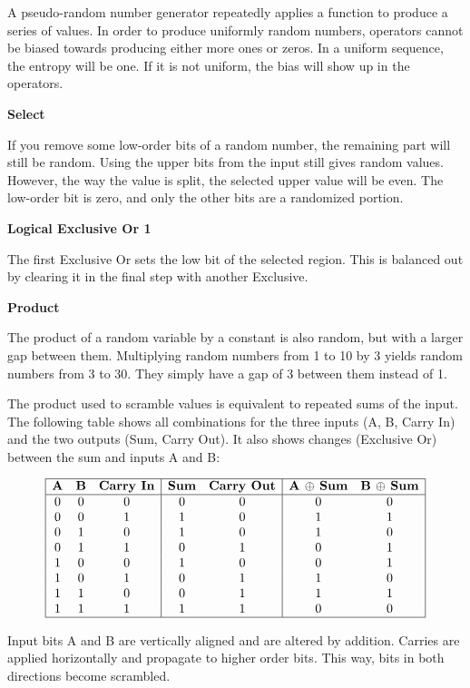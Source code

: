 \documentclass[letterpaper]{article}
\begin{document}
A pseudo-random number generator repeatedly applies a function to produce a series of values. In order to produce uniformly random numbers, operators cannot be biased towards producing either more ones or zeros. In a uniform sequence, the entropy will be one. If it is not uniform, the bias will show up in the operators.

\textbf{Select}

If you remove some low-order bits of a random number, the remaining part will still be random. Using the upper bits from the input still gives random values. However, the way the value is split, the selected upper value will be even. The low-order bit is zero, and only the other bits are a randomized portion.

\textbf{Logical Exclusive Or 1}

The first Exclusive Or sets the low bit of the selected region. This is balanced out by clearing it in the final step with another Exclusive.

\textbf{Product}

The product of a random variable by a constant is also random, but with a larger gap between them. Multiplying random numbers from 1 to 10 by 3 yields random numbers from 3 to 30. They simply have a gap of 3 between them instead of 1.

The product used to scramble values is equivalent to repeated sums of the input. The following table shows all combinations for the three inputs (A, B, Carry In) and the two outputs (Sum, Carry Out). It also shows changes (Exclusive Or) between the sum and inputs A and B:

\[
\begin{array}{|c c c|c c|c c|}
\hline
\textbf{A} & \textbf{B} & \textbf{Carry In} & \textbf{Sum} & \textbf{Carry Out} & \textbf{A $\oplus$ Sum} & \textbf{B $\oplus$ Sum} \\ 
\hline
0 & 0 & 0 & 0 & 0 & 0 & 0 \\
0 & 0 & 1 & 1 & 0 & 1 & 1 \\
0 & 1 & 0 & 1 & 0 & 1 & 0 \\
0 & 1 & 1 & 0 & 1 & 0 & 1 \\
1 & 0 & 0 & 1 & 0 & 0 & 1 \\
1 & 0 & 1 & 0 & 1 & 1 & 0 \\
1 & 1 & 0 & 0 & 1 & 1 & 1 \\
1 & 1 & 1 & 1 & 1 & 0 & 0 \\ 
\hline
\end{array}
\]

Input bits A and B are vertically aligned and are altered by addition. Carries are applied horizontally and propagate to higher order bits. This way, bits in both directions become scrambled.
\end{document}

